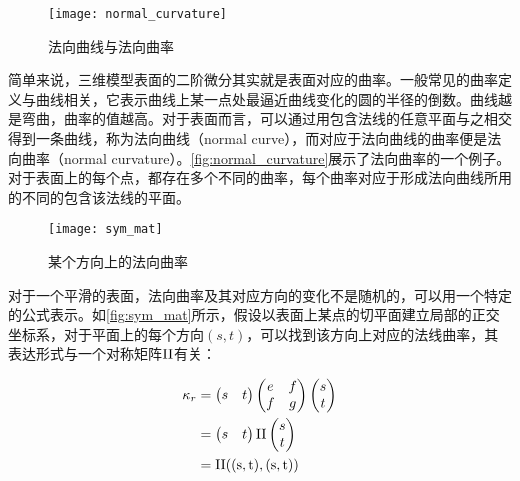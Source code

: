 \begin{figure}[tbh]
    \centering
    \texttt{[image: normal\_curvature]}
    \caption{\label{fig:normal_curvature}
    法向曲线与法向曲率}
\end{figure}

简单来说，三维模型表面的二阶微分其实就是表面对应的曲率。一般常见的曲率定义与曲线相关，它表示曲线上某一点处最逼近曲线变化的圆的半径的倒数。曲线越是弯曲，曲率的值越高。对于表面而言，可以通过用包含法线的任意平面与之相交得到一条曲线，称为法向曲线（normal curve），而对应于法向曲线的曲率便是法向曲率（normal curvature）。\autoref{fig:normal_curvature}\cite{rusinkiewicz2008line}展示了法向曲率的一个例子。对于表面上的每个点，都存在多个不同的曲率，每个曲率对应于形成法向曲线所用的不同的包含该法线的平面。

\begin{figure}[tbh]
    \centering
    \texttt{[image: sym\_mat]}
    \caption{\label{fig:sym_mat}
    某个方向上的法向曲率}
\end{figure}

对于一个平滑的表面，法向曲率及其对应方向的变化不是随机的，可以用一个特定的公式表示。如\autoref{fig:sym_mat}\cite{rusinkiewicz2008line}所示，假设以表面上某点的切平面建立局部的正交坐标系，对于平面上的每个方向$(s,t)$，可以找到该方向上对应的法线曲率，其表达形式与一个对称矩阵$\rm II$有关：

\begin{equation}
    \begin{split}
        \kappa_r &= 
        \begin{pmatrix}
            s & t
        \end{pmatrix}
        \begin{pmatrix}
            e & f \\
            f & g
        \end{pmatrix}
        \begin{pmatrix}
            s \\
            t
        \end{pmatrix} \\
        &= 
        \begin{pmatrix}
            s & t
        \end{pmatrix}
        \rm II
        \begin{pmatrix}
            s \\
            t
        \end{pmatrix} \\
        &= 
        \rm II((s, t), (s, t))
    \end{split}
\end{equation}

